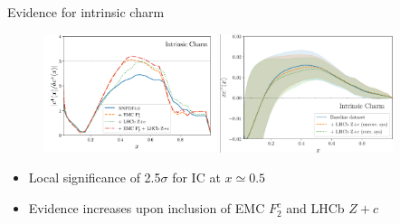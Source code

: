 \documentclass[aspectratio=43, 8pt,t]{beamer}
\begin{document}
\begin{frame}{Evidence for intrinsic charm}
  \begin{figure}
    \includegraphics[width=0.45\textwidth]{ic_f2c_zc.png}
    \includegraphics[width=0.45\textwidth]{lhcb_reweithed.png}
  \end{figure}
  \begin{itemize}
    \item Local significance of 2.5$\sigma$ for IC at $x\simeq 0.5$
    \item Evidence increases upon inclusion of EMC $F_2^c$ and LHCb $Z+c$
  \end{itemize}
\end{frame}
\end{document}
